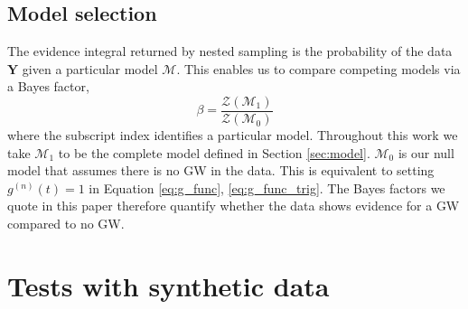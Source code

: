 \documentclass[fleqn,usenatbib,useAMS]{mnras}
\begin{document}








\subsection{Model selection}\label{sec:model_selection}
The evidence integral returned by nested sampling is the probability of the data $\boldsymbol{Y}$ given a particular model $\mathcal{M}$. This enables us to compare competing models via a Bayes factor,
\begin{equation}
	\beta = \frac{\mathcal{Z}(\mathcal{M}_1)}{\mathcal{Z}(\mathcal{M}_0)}
\end{equation}
where the subscript index identifies a particular model. Throughout this work we take $\mathcal{M}_1$ to be the complete model defined in Section \ref{sec:model}. $\mathcal{M}_0$ is our null model that assumes there is no GW in the data. This is equivalent to setting $g^{(n)}(t)=1$ in Equation \ref{eq:g_func}, \ref{eq:g_func_trig}. The Bayes factors we quote in this paper therefore quantify whether the data shows evidence for a GW compared to no GW.






\section{Tests with synthetic data} \label{sec:testing}
\end{document}
